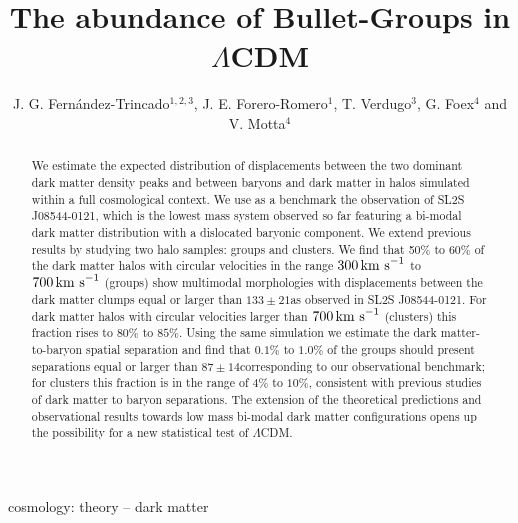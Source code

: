 \documentclass{emulateapj}
\newcommand{\hkpc}{{\ifmmode{h^{-1}{\rm kpc}}\else{$h^{-1}$kpc }\fi}}
\newcommand{\kms}{{\ifmmode{{\mathrm{\,km\ s}^{-1}}}\else{\,km~s$^{-1}$}\fi}}
\newcommand{\bullg}{SL2S J08544-0121}
\begin{document}
 

\title{The abundance of Bullet-Groups in $\Lambda$CDM}
\author{J. G. Fern\'andez-Trincado$^{1,2,3}$, J. E. Forero-Romero$^1$,
  T. Verdugo$^3$, G. Foex$^4$ and V. Motta$^4$} 

\begin{abstract}

We estimate the expected distribution of displacements between the two
dominant dark matter density peaks and between baryons and dark matter
in halos simulated within a full cosmological context. We use as a benchmark the
observation of \bullg, which is the lowest mass system observed so far
featuring a bi-modal dark matter distribution with a dislocated 
baryonic component. We extend previous results by
studying two halo samples: groups and clusters. We find that 50\% to 60\%
of the dark matter halos with circular velocities in the range
$300\kms$ to $700\kms$ (groups) show multimodal morphologies with
displacements between the dark matter clumps equal or larger than
$133\pm21$\hkpc as observed in \bullg. For dark matter halos with
circular velocities larger than $700\kms$ (clusters) this fraction
rises to $80\%$ to $85\%$. Using the same simulation we estimate the
dark matter-to-baryon spatial separation and find that $0.1\%$ to
$1.0\%$ of the groups should present separations equal or
larger than $87\pm 14$\hkpc corresponding to our observational
benchmark; for clusters this fraction is in the range of $4\%$ to
$10\%$, consistent with previous studies of dark matter to baryon
separations. The extension of the theoretical predictions and
observational results towards low mass bi-modal dark matter
configurations opens up the possibility for a new statistical test of
$\Lambda$CDM.   
\end{abstract}

\begin{keywords}
{cosmology: theory -- dark matter} 
\end{keywords}
\end{document}
